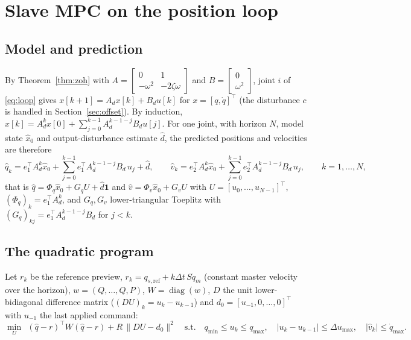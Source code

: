 \documentclass[11pt,a4paper]{article}
\theoremstyle{remark}
\theoremstyle{definition}
\newcommand{\diag}{\operatorname{diag}}
\begin{document}
\section{Slave MPC on the position loop}\label{sec:mpc}
\subsection{Model and prediction}
By Theorem~\ref{thm:zoh} with $A=\begin{bmatrix}0&1\\-\omega^2&-2\zeta\omega\end{bmatrix}$ and $B=\begin{bmatrix}0\\\omega^2\end{bmatrix}$, joint $i$ of \eqref{eq:loop} gives
$x[k+1]=A_dx[k]+B_du[k]$ for $x=[q,\dot q]^\top$ (the disturbance $c$ is handled in Section~\ref{sec:offset}). By induction,
$x[k]=A_d^{k}x[0]+\sum_{j=0}^{k-1}A_d^{k-1-j}B_du[j]$. For one joint, with horizon $N$, model state $\hat x_0$ and output-disturbance estimate $\hat d$, the predicted positions and velocities are therefore
\begin{equation}\label{eq:pred}
\hat q_k=e_1^\top A_d^{k}\hat x_0+\sum_{j=0}^{k-1}e_1^\top A_d^{k-1-j}B_d\,u_j+\hat d,\qquad
\hat v_k=e_2^\top A_d^{k}\hat x_0+\sum_{j=0}^{k-1}e_2^\top A_d^{k-1-j}B_d\,u_j,\qquad k=1,\dots,N,
\end{equation}
that is $\hat q=\Phi_q\hat x_0+G_qU+\hat d\mathbf 1$ and $\hat v=\Phi_v\hat x_0+G_vU$ with $U=[u_0,\dots,u_{N-1}]^\top$, $(\Phi_q)_{k}=e_1^\top A_d^k$, and $G_q,G_v$ lower-triangular Toeplitz with
$(G_q)_{kj}=e_1^\top A_d^{k-1-j}B_d$ for $j<k$.

\subsection{The quadratic program}
Let $r_k$ be the reference preview, $r_k=q_{s,\mathrm{ref}}+k\Delta t\,S\dot q_m$ (constant master velocity over the horizon), $w=(Q,\dots,Q,P)$, $W=\diag(w)$, $D$ the unit lower-bidiagonal difference matrix
($(DU)_k=u_k-u_{k-1}$) and $d_0=[u_{-1},0,\dots,0]^\top$ with $u_{-1}$ the last applied command:
\begin{equation}\label{eq:mpc}
\min_{U}\ \ (\hat q-r)^\top W(\hat q-r)+R\,\|DU-d_0\|^2\quad\text{s.t.}\quad
q_{\min}\le u_k\le q_{\max},\quad |u_k-u_{k-1}|\le\Delta u_{\max},\quad |\hat v_k|\le\dot q_{\max}.
\end{equation}
\end{document}
